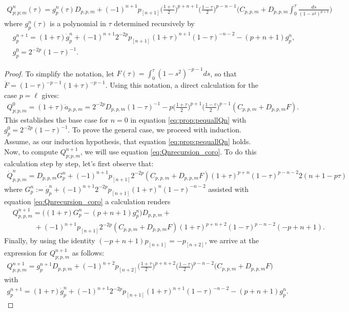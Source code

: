 \begin{proposition}\label{prop:pequallQn}
  \begin{align}\label{eq:prop:pequallQn}
    Q^{n}_{p;p;m}(\tau)=g^n_{p}(\tau)D_{p,p,m} + (-1)^{n+1}p_{[n+1]}\Big(\frac{1+\tau}{2}\Big)^{p+n+1}\Big(\frac{1-\tau}{2}\Big)^{p-n-1}\Bigg(C_{p,p,m} + D_{p,p,m} \int_{0}^{\tau} \frac{ds}{(1-s^2)^{p+1}}\Bigg)
  \end{align}
  where $g^n_p(\tau)$ is a polynomial in $\tau$ determined recursively
  by
\begin{align}
  & g^{n+1}_p = (1+\tau)\dot{g}^{n}_p+(-1)^{n+1}2^{-2p}p_{[n+1]}(1+\tau)^{n+1}(1-\tau)^{-n-2}-(p+n+1)g^{n}_p, \\
  & g^{0}_p = 2^{-2p}(1-\tau)^{-1}.
\end{align}

\begin{proof}
  To simplify the notation, let $F(\tau) = \int_{0}^{\tau} (1-s^2)^{-p-1} ds$, so that $\dot{F} = (1-\tau)^{-p-1}(1+\tau)^{-p-1}$. Using this notation, a direct calculation for the case $p = \ell$ gives:
\begin{align}
Q^{0}_{p;p,m}=(1+\tau)\dot{a}_{p,p,m}=2^{-2p}D_{p,p,m}(1-\tau)^{-1} - p\Big(\frac{1+\tau}{2}\Big)^{p+1}\Big(\frac{1-\tau}{2}\Big)^{p-1}(C_{p,p,m}+D_{p,p,m}F).
\end{align}
This establishes the base case for $n=0$ in equation \eqref{eq:prop:pequallQn} with $g^0_p=2^{-2p}(1-\tau)^{-1}$. To prove the general case, we proceed with induction. Assume, as our induction hypothesis, that equation \eqref{eq:prop:pequallQn} holds. Now, to compute $Q^{n+1}_{p;p,m}$, we will use equation \eqref{eq:Qnrecursion_coro}. To do this calculation step by step, let's first observe that:
\begin{align}
\dot{Q}^{n}_{p,p,m} = D_{p,p,m}G^{n}_p+(-1)^{n+1}p_{[n+1]}2^{-2p}(C_{p,p,m}+D_{p,p,m}F)(1+\tau)^{p+n}(1-\tau)^{p-n-2}2(n+1-p\tau)
\end{align}
where $G^{n}_p:=\dot{g}^{n}_p+(-1)^{n+1}2^{-2p}p_{[n+1]}(1+\tau)^{n}(1-\tau)^{-n-2}$ assisted with equation \eqref{eq:Qnrecursion_coro} a calculation renders
\begin{align}
  & Q^{n+1}_{p,p,m} = \Big((1+\tau)G^{n}_p-(p+n+1)g^{n}_p\Big)D_{p,p,m} + \nonumber \\ 
  & \qquad \quad + (-1)^{n+1}p_{[n+1]}2^{-2p}(C_{p,p,m}+D_{p,p,m}F)(1+\tau)^{p+n+2}(1-\tau)^{p-n-2}(-p+n+1).
\end{align}
Finally, by using the identity $(-p+n+1)p_{[n+1]}=-p_{[n+2]}$, we arrive at the expression for $Q^{n+1}_{p;p,m}$ as follows:
\begin{align}
  Q^{n+1}_{p,p,m} =g^{n+1}_p D_{p,p,m} + (-1)^{n+2}p_{[n+2]}\Big(\frac{1+\tau}{2}\Big)^{p+n+2}\Big(\frac{1-\tau}{2}\Big)^{p-n-2}\Bigg(C_{p,p,m} +D_{p,p,m} F\Bigg)
\end{align}
with
\begin{align}
g^{n+1}_p=(1+\tau)\dot{g}^{n}_p+(-1)^{n+1}2^{-2p}p_{[n+1]}(1+\tau)^{n+1}(1-\tau)^{-n-2}-(p+n+1)g^{n}_p.
\end{align}
\end{proof}
\end{proposition}

